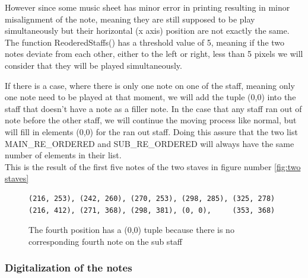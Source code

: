 \documentclass[a4paper,12pt]{report}
\begin{document}
However since some music sheet has minor error in printing resulting in minor
misalignment of the note, meaning they are still supposed to be play
simultaneously but their horizontal (x axis) position are not exactly the
same. The function ReoderedStaffs() has a threshold value of 5, meaning if
the two notes deviate from each other, either to the left or right, less than
5 pixels we will consider that they will be played simultaneously.

If there is a case, where there is only one note on one of the staff, meaning
only one note need to be played at that moment, we will add the tuple (0,0)
into the staff that doesn't have a note as a filler note. In the case that any
staff ran out of note before the other staff, we will continue the moving
process like normal, but will fill in elements (0,0) for the ran out staff.
Doing this assure that the two list MAIN\_RE\_ORDERED and SUB\_RE\_ORDERED will
always have the same number of elements in their list.\\

\noindent This is the result of the first five notes of the two staves in figure number
\ref{fig:two staves}\\

\begin{figure}[H]
\begin{verbatim}
(216, 253), (242, 260), (270, 253), (298, 285), (325, 278)
(216, 412), (271, 368), (298, 381), (0, 0),     (353, 368)
\end{verbatim}
\caption{The fourth position has a (0,0) tuple because there is no corresponding fourth
note on the sub staff}
\end{figure}

\subsubsection{Digitalization of the notes}




\printbibliography
\end{document}
